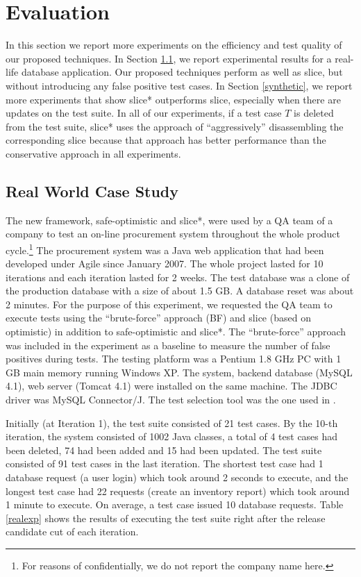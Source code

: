 \documentclass[authoryear,preprint,12pt]{elsarticle}
\begin{document}
\section{Evaluation}
   \label{experiment}
   In this section we report more experiments on the efficiency and test quality of our proposed techniques.
   In  Section \ref{real}, we report experimental results for a real-life database application.
   Our proposed techniques perform as well as {\sc slice}, but without 
   introducing any false positive test cases.
   In Section \ref{synthetic}, we report more experiments that show {\sc slice*} 
   outperforms {\sc slice}, especially when there are updates on the test suite.
   In all of our experiments, if a test case $T$ is deleted from the test suite, {\sc slice*} uses the approach of ``aggressively'' disassembling the corresponding slice
   because that approach has better performance than the conservative approach in all experiments.
      
   \subsection{Real World Case Study}
    \label{real}
    
    The new framework, {\sc safe-optimistic} and {\sc slice*}, were used 
    by a QA team of a company to test an on-line procurement system throughout the whole product cycle.\footnote{For reasons of confidentially, we do not report the company name here.}
The procurement system was a Java web application that had been developed under Agile since January 2007.
The whole project lasted for 10 iterations and each iteration lasted for 2 weeks.
The test database was a clone of the production database with a size of about 1.5 GB.
A database reset was about 2 minutes.
For the purpose of this experiment,
we requested the QA team to execute tests using the ``brute-force'' approach (BF) and {\sc slice} (based on {\sc optimistic}) in addition to {\sc safe-optimistic} and {\sc slice*}.
The ``brute-force'' approach was included in the experiment as a baseline to measure the number of false positives during tests.
The testing platform was a Pentium 1.8 GHz PC with 1 GB main memory running Windows XP.
The system, backend database (MySQL 4.1), web server (Tomcat 4.1) were installed on the same machine.
The JDBC driver was MySQL Connector/J.
The test selection tool was the one used in \cite{icsm05willlmor}.

Initially (at Iteration 1), 
the test suite consisted of 21 test cases.
By the 10-th iteration, 
the system consisted of 1002 Java classes,
a total of 4 test cases had been deleted, 74 had been added and 15 had been updated.
The test suite consisted of 91 test cases in the last iteration.
The shortest test case had 1 database request (a user login) which took around 2 seconds to execute,
and the longest test case had 22 requests (create an inventory report) which took around 1 minute to execute.
On average, a test case issued 10 database requests.
Table \ref{realexp} shows the results of executing the test suite right after the release candidate cut of each iteration.
\end{document}

